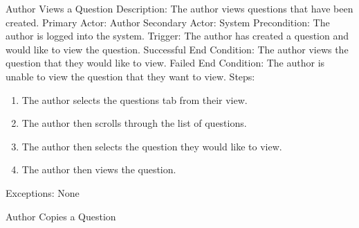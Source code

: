     
    
    \begin{section}{Author Views a Question}
        Description: The author views questions that have been created. \newline
        Primary Actor: Author \newline
        Secondary Actor: System \newline
        Precondition: The author is logged into the system. \newline
        Trigger: The author has created a question and would like to view the question. \newline
        Successful End Condition: The author views the question that they would like to view. \newline
        Failed End Condition: The author is unable to view the question that they want to view. \newline
        \newline
        Steps:
        \begin{enumerate}
            \item{The author selects the questions tab from their view.}
            \item{The author then scrolls through the list of questions.}
            \item{The author then selects the question they would like to view.}
            \item{The author then views the question.}
        \end{enumerate}
        Exceptions: None
    \end{section}
    
    
    \begin{section}{Author Copies a Question} 
    
    \end{section}


